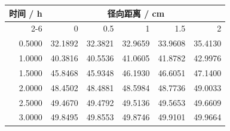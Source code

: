 \begin{tabular}{rrrrrr}
\toprule
时间 / h & \multicolumn{5}{c}{径向距离 / cm} \\
\cmidrule(lr){2-6}
 & 0 & 0.5 & 1 & 1.5 & 2 \\
\midrule
0.5000 & 32.1892 & 32.3821 & 32.9659 & 33.9608 & 35.4130 \\
1.0000 & 40.3816 & 40.5536 & 41.0605 & 41.8782 & 42.9976 \\
1.5000 & 45.8468 & 45.9348 & 46.1930 & 46.6051 & 47.1400 \\
2.0000 & 48.4502 & 48.4881 & 48.5984 & 48.7736 & 49.0033 \\
2.5000 & 49.4670 & 49.4792 & 49.5136 & 49.5653 & 49.6609 \\
3.0000 & 49.8495 & 49.8553 & 49.8746 & 49.9101 & 49.9664 \\
\bottomrule
\end{tabular}

